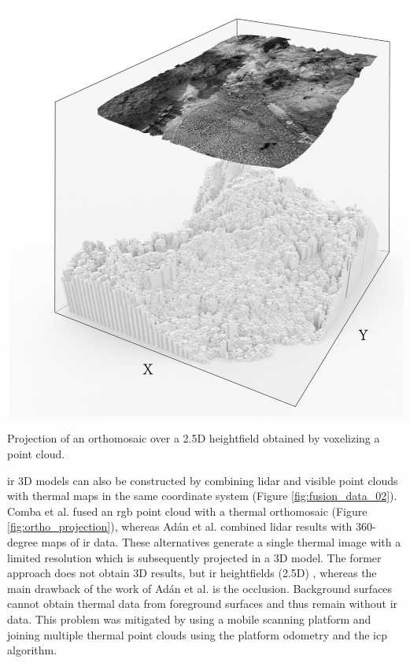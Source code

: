 \begin{marginfigure}[0cm]
	\includegraphics{figs/context/orthomosaic_projection.png}
	\caption{Projection of an orthomosaic over a 2.5D heightfield obtained by voxelizing a point cloud.}
	\label{fig:ortho_projection}
\end{marginfigure}
\acrshort{ir} 3D models can also be constructed by combining \acrshort{lidar} and visible point clouds with thermal maps in the same coordinate system (Figure \ref{fig:fusion_data_02}). Comba et al. \cite{comba_2d_2019} fused an \acrshort{rgb} point cloud with a thermal orthomosaic (Figure \ref{fig:ortho_projection}), whereas Adán et al. \cite{adan_towards_2020} combined \acrshort{lidar} results with 360-degree maps of \acrshort{ir} data. These alternatives generate a single thermal image with a limited resolution which is subsequently projected in a 3D model. The former approach does not obtain 3D results, but \acrshort{ir} heightfields (2.5D) \cite{juszczyk_wound_2021}, whereas the main drawback of the work of Adán et al. \cite{adan_towards_2020} is the occlusion. Background surfaces cannot obtain thermal data from foreground surfaces and thus remain without \acrshort{ir} data. This problem was mitigated by using a mobile scanning platform and joining multiple thermal point clouds using the platform odometry and the \acrshort{icp} algorithm. 

